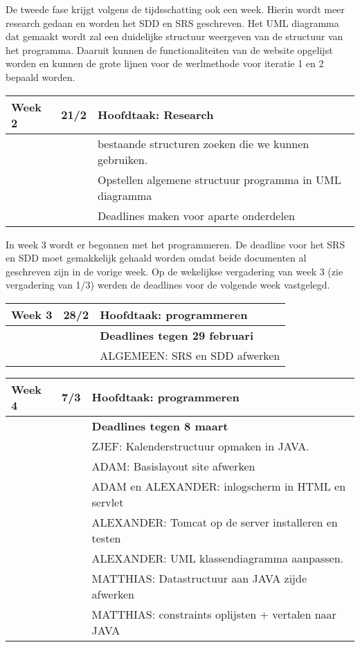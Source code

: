 \documentclass{article}
\begin{document}
De tweede fase krijgt volgens de tijdsschatting ook een week. Hierin wordt meer research gedaan en worden het SDD en SRS geschreven. Het UML diagramma dat gemaakt wordt zal een duidelijke structuur weergeven van de structuur van het programma. Daaruit kunnen de functionaliteiten van de website opgelijst worden en kunnen de grote lijnen voor de werlmethode voor iteratie 1 en 2 bepaald worden.
\begin{center}
\begin{tabular}[t]{|p{1.3cm}|p{0.8cm}|p{9cm}|}
 \hline
Week 2	& 21/2 &	\textbf{Hoofdtaak:} Research \\
\hline
 & & bestaande structuren zoeken die we kunnen gebruiken. \\
 & & Opstellen algemene structuur programma in UML diagramma \\
 & & Deadlines maken voor aparte onderdelen \\
 \hline
 \end{tabular}
 \end{center}
 
 In week 3 wordt er begonnen met het programmeren. De deadline voor het SRS en SDD moet gemakkelijk gehaald worden omdat beide documenten al geschreven zijn in de vorige week. Op de wekelijkse vergadering van week 3 (zie vergadering van 1/3) werden de deadlines voor de volgende week vastgelegd.
 
\begin{center} 
\begin{tabular}[t]{|p{1.3cm}|p{0.8cm}|p{9cm}|}
 \hline
Week 3	& 28/2 &	\textbf{Hoofdtaak:} programmeren \\
\hline
 & & \textbf{Deadlines tegen 29 februari} \\
 & & ALGEMEEN: SRS en SDD afwerken \\
\hline
\end{tabular}
\end{center}



\begin{center}
\begin{tabular}[t]{|p{1.3cm}|p{0.8cm}|p{9cm}|}
\hline
Week 4	& 7/3 &	\textbf{Hoofdtaak:} programmeren \\
\hline
 & & \textbf{Deadlines tegen 8 maart} \\
 & & ZJEF:  Kalenderstructuur opmaken in JAVA. \\
 & & ADAM: Basislayout site afwerken \\
 & & ADAM en ALEXANDER: inlogscherm in HTML en servlet  \\
 & & ALEXANDER:  Tomcat op de server installeren en testen \\
 & & ALEXANDER: UML klassendiagramma aanpassen.  \\
 & & MATTHIAS: Datastructuur aan JAVA zijde afwerken \\
 & & MATTHIAS: constraints oplijsten + vertalen naar JAVA \\
\hline
\end{tabular}
\end{center} 
 
\end{document}
